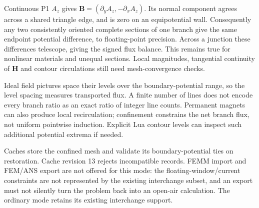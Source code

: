 Continuous P1 $A_z$ gives $\mathbf B=(\partial_y A_z,-\partial_x A_z)$.
Its normal component agrees across a shared triangle edge, and is zero on
an equipotential wall. Consequently any two consistently oriented complete
sections of one branch give the same endpoint potential difference, to
floating-point precision. Across a junction these differences telescope,
giving the signed flux balance. This remains true for nonlinear materials
and unequal sections. Local magnitudes, tangential continuity of $\mathbf H$
and contour circulations still need mesh-convergence checks.

Ideal field pictures space their levels over the boundary-potential range,
so the level spacing measures transported flux. A finite number of lines
does not encode every branch ratio as an exact ratio of integer line counts.
Permanent magnets can also produce local recirculation; confinement constrains
the net branch flux, not uniform pointwise induction. Explicit Lua contour
levels can inspect such additional potential extrema if needed.

Caches store the confined mesh and validate its boundary-potential ties on
restoration. Cache revision 13 rejects incompatible records. FEMM import
and FEM/ANS export are not offered for this mode: the floating-window/current
constraints are not represented by the existing interchange subset, and an
export must not silently turn the problem back into an open-air calculation.
The ordinary mode retains its existing interchange support.
